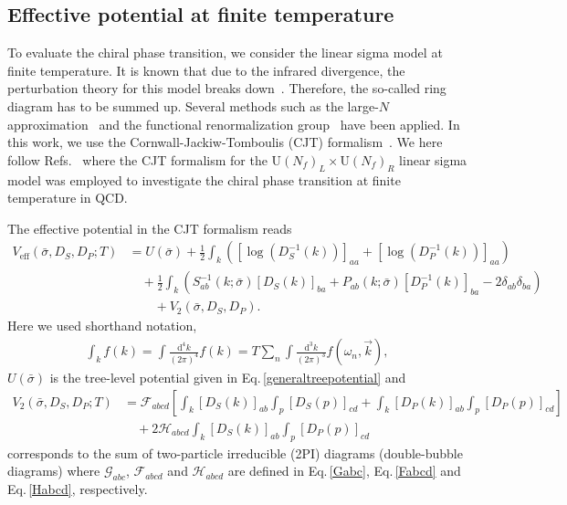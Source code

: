 \documentclass[a4paper,preprint,superscriptaddress,preprintnumbers,nofootinbib]{revtex4}
\newcommand{\al}[1]{\begin{align}#1\end{align}}
\newcommand{\nn}{\nonumber\\}
\newcommand{\df}{\text{d}}
\newcommand{\fn}[1]{\!\left(#1\right)}
\begin{document}
\begin{appendix}
\subsection{Effective potential at finite temperature}\label{EFPlinear}
To evaluate the chiral phase transition, we consider the linear sigma model at finite temperature.
It is known that due to the infrared divergence, the perturbation theory for this model breaks down~\cite{Dolan:1973qd}.
Therefore, the so-called ring diagram has to be summed up.
Several methods such as the large-$N$ approximation~\cite{Fejos:2012pm} and the functional renormalization group~\cite{Mitter:2013fxa,Fejos:2014qga,Fejos:2016hbp} have been applied.
In this work, we use the Cornwall-Jackiw-Tomboulis (CJT) formalism~\cite{Cornwall:1974vz}.
We here follow Refs.~\cite{Lenaghan:2000ey,Roder:2003uz} where the CJT formalism for the $\text{U}\fn{N_f}_L\times \text{U}\fn{N_f}_R$ linear sigma model was employed to investigate the chiral phase transition at finite temperature in QCD.

The effective potential in the CJT formalism reads
\al{
V_\text{eff}\fn{\bar \sigma,D_S,D_P ;T}
&=U\fn{\bar \sigma} 
+\frac{1}{2}\int _k \left( \left[\log\fn{D_S^{-1}\fn{k}} \right]_{aa} +\left[\log\fn{D_P^{-1}\fn{k}} \right]_{aa}  \right)\nn
&\quad
+\frac{1}{2}\int _k \left( S_{ab}^{-1}\fn{k;\bar \sigma} [D_S\fn{k}]_{ba} +P_{ab}\fn{k;\bar \sigma} [D_P^{-1}\fn{k}]_{ba} -2\delta_{ab}\delta_{ba} \right)\nn
&\qquad
+V_2\fn{\bar \sigma,D_S,D_P}.
\label{fTeffectivepotential}
}
Here we used shorthand notation,
\al{
\int_k f\fn{k}=\int \frac{\df ^4k}{(2\pi)^4}f\fn{k}=T\sum_{n}\int \frac{\df^3k}{(2\pi)^3}f\fn{\omega_n,{\vec k}},
}
$U\fn{\bar \sigma}$ is the tree-level potential given in Eq.\,\eqref{generaltreepotential} and 
\al{
V_2\fn{\bar \sigma,D_S,D_P;T}
&={\mathcal F}_{abcd}\left[ \int_k [D_S\fn{k}]_{ab} \int_p [D_S\fn{p} ]_{cd} 
+ \int_k [D_P\fn{k}]_{ab} \int_p [D_P\fn{p} ]_{cd}
 \right]\nn
&\quad
+2{\mathcal H}_{abcd}\int_k [D_S\fn{k}]_{ab} \int_p [D_P\fn{p} ]_{cd}
}
corresponds to the sum of two-particle irreducible (2PI) diagrams (double-bubble diagrams) where ${\mathcal G}_{abc}$, ${\mathcal F}_{abcd}$ and ${\mathcal H}_{abcd}$ are defined in Eq.\,\eqref{Gabc}, Eq.\,\eqref{Fabcd} and Eq.\,\eqref{Habcd}, respectively.


\end{appendix}
\end{document}
